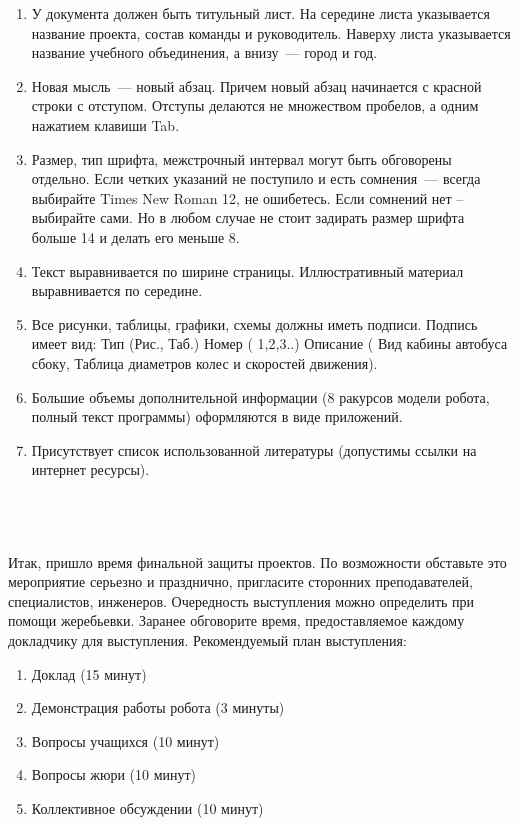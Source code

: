 \begin{enumerate}
	\item У документа должен быть титульный лист. На середине листа указывается название проекта, состав команды и руководитель. Наверху листа указывается название учебного объединения, а внизу~--- город и год.
	
	\item Новая мысль~--- новый абзац. Причем новый абзац начинается с красной строки с отступом. Отступы делаются не множеством пробелов, а одним нажатием клавиши Tab.
	
	\item Размер, тип шрифта, межстрочный интервал могут быть обговорены отдельно. Если четких указаний не поступило и есть сомнения~--- всегда выбирайте Times New Roman 12, не ошибетесь. Если сомнений нет – выбирайте сами. Но в любом случае не стоит задирать размер шрифта больше 14 и делать его меньше 8.
	
	\item Текст выравнивается по ширине страницы. Иллюстративный материал выравнивается по середине.
	
	\item Все рисунки, таблицы, графики, схемы должны иметь подписи. Подпись имеет вид: Тип (Рис., Таб.) Номер ( 1,2,3..) Описание ( Вид кабины автобуса сбоку, Таблица диаметров колес и скоростей движения). 
	
	\item Большие объемы дополнительной информации (8 ракурсов модели робота, полный текст программы) оформляются в виде приложений.
	
	\item Присутствует список использованной литературы (допустимы ссылки на интернет ресурсы).\\\\
\end{enumerate}

{\hypertarget{lesson29x4}{}}\\\\

Итак, пришло время финальной защиты проектов. По возможности обставьте это мероприятие серьезно и празднично, пригласите сторонних преподавателей, специалистов, инженеров. Очередность выступления можно определить при помощи жеребьевки. Заранее обговорите время, предоставляемое каждому докладчику для выступления. Рекомендуемый план выступления:

\begin{enumerate}
	\item Доклад  (15 минут)
	\item Демонстрация работы робота (3 минуты)
	\item Вопросы учащихся (10 минут)
	\item Вопросы жюри (10 минут)
	\item Коллективное обсуждении (10 минут)
\end{enumerate}

